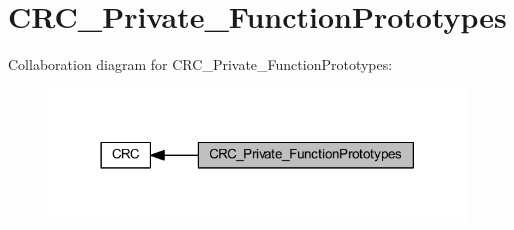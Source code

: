 \hypertarget{group___c_r_c___private___function_prototypes}{}\section{C\+R\+C\+\_\+\+Private\+\_\+\+Function\+Prototypes}
\label{group___c_r_c___private___function_prototypes}
Collaboration diagram for C\+R\+C\+\_\+\+Private\+\_\+\+Function\+Prototypes\+:
\nopagebreak
\begin{figure}[H]
\begin{center}
\leavevmode
\includegraphics[width=314pt]{group___c_r_c___private___function_prototypes}
\end{center}
\end{figure}
